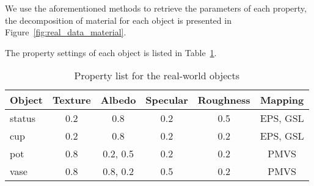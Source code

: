 We use the aforementioned methods to retrieve the parameters of each property, the decomposition of material for each object is presented in Figure~\ref{fig:real_data_material}.

The property settings of each object is listed in Table~\ref{tab:real_data_prop_list}.
\begin{table}[!htbp]
  \centering
  \begin{tabular}{l*{5}{c}}
  \hline
  \textbf{Object} & Texture & Albedo & Specular & Roughness & Mapping\\
  \hline
  status & 0.2 & 0.8 & 0.2 & 0.5 & EPS, GSL\\
  cup & 0.2 & 0.8 & 0.2 & 0.2 & EPS, GSL\\
  pot & 0.8 & 0.2, 0.5 & 0.2 & 0.2 & PMVS\\
  vase & 0.8 & 0.8, 0.2 & 0.5 & 0.2 & PMVS\\
  \hline
  \end{tabular}
  \caption{Property list for the real-world objects}
  \label{tab:real_data_prop_list}
\end{table}

